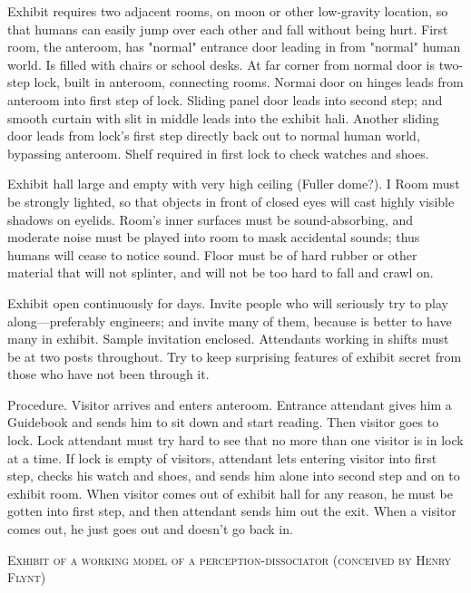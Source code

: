 \documentclass[10pt,twoside]{memoir}
\begin{document}
\begin{enumerate}
{\begin{enumerate}
\begin{sysrules}
\begin{sysrules}
\begin{sysrules}
\begin{sysrules}
{\begin{enumerate}
\begin{sysrules}
Exhibit requires two adjacent rooms, on moon or other low-gravity 
location, so that humans can easily jump over each other and fall without 
being hurt. First room, the anteroom, has "normal" entrance door leading in 
from "normal" human world. Is filled with chairs or school desks. At far 
corner from normal door is two-step lock, built in anteroom, connecting 
rooms. Normai door on hinges leads from anteroom into first step of lock. 
Sliding panel door leads into second step; and smooth curtain with slit in 
middle leads into the exhibit hali. Another sliding door leads from lock's 
first step directly back out to normal human world, bypassing anteroom. 
Shelf required in first lock to check watches and shoes. 

Exhibit hall large and empty with very high ceiling (Fuller dome?). I 
Room must be strongly lighted, so that objects in front of closed eyes will 
cast highly visible shadows on eyelids. Room's inner surfaces must be 
sound-absorbing, and moderate noise must be played into room to mask 
accidental sounds; thus humans will cease to notice sound. Floor must be of 
hard rubber or other material that will not splinter, and will not be too hard 
to fall and crawl on. 

Exhibit open continuously for days. Invite people who will seriously 
try to play along---preferably engineers; and invite many of them, because 
is better to have many in exhibit. Sample invitation enclosed. Attendants 
working in shifts must be at two posts throughout. Try to keep surprising 
features of exhibit secret from those who have not been through it. 

Procedure. Visitor arrives and enters anteroom. Entrance attendant 
gives him a Guidebook and sends him to sit down and start reading. Then 
visitor goes to lock. Lock attendant must try hard to see that no more than 
one visitor is in lock at a time. If lock is empty of visitors, attendant lets 
entering visitor into first step, checks his watch and shoes, and sends him 
alone into second step and on to exhibit room. When visitor comes out of 
exhibit hall for any reason, he must be gotten into first step, and then 
attendant sends him out the exit. When a visitor comes out, he just goes out 
and doesn't go back in. 



\clearpage

\textsc{Exhibit of a working model of a perception-dissociator (conceived by Henry Flynt)}





\end{sysrules}
\end{enumerate}}
\end{sysrules}
\end{sysrules}
\end{sysrules}
\end{sysrules}
\end{enumerate}}
\end{enumerate}
\end{document}
